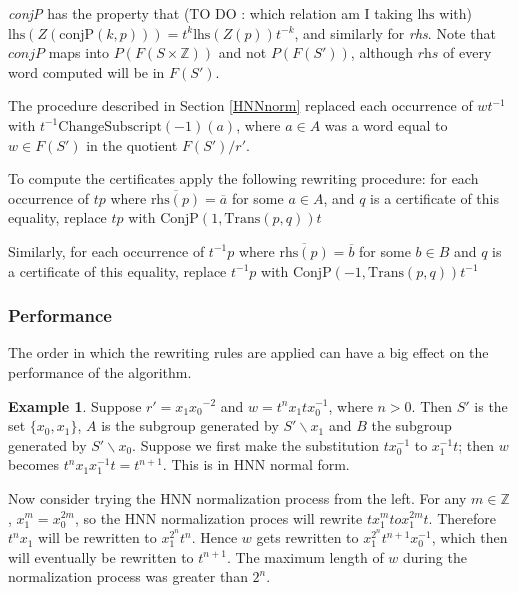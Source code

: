 \documentclass[12pt]{article} %
\theoremstyle{definition}
\theoremstyle{definition}
\theoremstyle{definition}
\theoremstyle{definition}
\theoremstyle{definition}
\theoremstyle{definition}
\newtheorem{exmpl}{Example}[theorem]
\begin{document}
\textit{conjP} has the property that (TO DO : which relation am I taking $\text{lhs}$ with)
$\text{lhs}(Z(\text{conjP}(k, p))) = t^k \text{lhs}(Z(p))t^{-k}$,
and similarly for \textit{rhs}. Note that $\textit{conjP}$ maps into $P(F(S \times \mathbb{Z}))$
and not $P(F(S'))$, although $\textit{rhs}$ of every word computed
will be in $F(S')$.

The procedure described in Section \ref{HNNnorm}
replaced each occurrence of $wt^{-1}$ with \newline $t^{-1}\text{ChangeSubscript}(-1)(a)$,
where $a \in A$ was a word equal to $w \in F(S')$ in the quotient $F(S') / r'$.

To compute the certificates apply the following rewriting procedure:
for each occurrence of $tp$ where $\overline{\text{rhs}(p)} = \overline{a}$ for
some $a \in A$, and $q$ is a certificate of this equality,
replace $tp$ with $\text{ConjP}(1, \text{Trans}(p, q))t$

Similarly, for each occurrence of $t^{-1}p$ where $\overline{\text{rhs}(p)} = \overline{b}$ for
some $b \in B$ and $q$ is a certificate of this equality,
replace $t^{-1}p$ with $\text{ConjP}(-1, \text{Trans}(p, q))t^{-1}$

\subsubsection{Performance}\label{HNNperf}

The order in which the rewriting rules are applied can have a big effect on the performance
of the algorithm.

\begin{exmpl}\label{ltrbad}
Suppose $r' = {x_1}{x_0}^{-2}$ and
$w = t^n x_1 t x_0^{-1}$, where $n > 0$.
Then $S'$ is the set $\{x_0, x_1\}$,
$A$ is the subgroup generated by $S' \backslash x_1$ and
$B$ the subgroup generated by $S' \backslash x_0$.
Suppose we first make the substitution $tx_0^{-1}$ to $x_1^{-1} t$;
then $w$ becomes $t^{n}x_1x_1^{-1}t = t^{n+1}$.
This is in HNN normal form.

Now consider trying the HNN normalization process from the left.
For any $m \in \mathbb{Z}$, $x_1^m = x_0^{2m}$,
so the HNN normalization proces will rewrite $tx_1^m to x_1^{2m}t$.
Therefore $t^nx_1$ will be rewritten to $x_1^{2^n}t^n$.
Hence $w$ gets rewritten to $x_1^{2^n} t^{n+1} x_0^{-1}$,
which then will eventually be rewritten to $t^{n+1}$. The maximum length
of $w$ during the normalization process was greater than $2^n$.
\end{exmpl}
\end{document}
